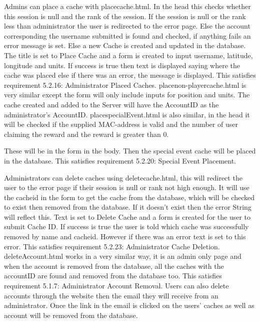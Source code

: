 Admins can place a cache with placecache.html. In the head this checks whether this session is null and the rank of the session. If the session is null or the rank less than administrator the user is redirected to the error page. Else the account corresponding the username submitted is found and checked, if anything fails an error message is set. Else a new Cache is created and updated in the database. The title is set to Place Cache and a form is created to input username, latitude, longitude and units. If success is true then text is displayed saying where the cache was placed else if there was an error, the message is displayed. This satisfies requirement 5.2.16: Administrator Placed Caches. placenon-playercache.html is very similar except the form will only include inputs for position and units. The cache created and added to the Server will have the AccountID as the administrator's AccountID. placespecialEvent.html is also similar, in the head it will be checked if the supplied MAC-address is valid and the number of user claiming the reward and the reward is greater than 0.

These will be in the form in the body. Then the special event cache will be placed in the database. This satisfies requirement 5.2.20: Special Event Placement.

Administrators can delete caches using deletecache.html, this will redirect the user to the error page if their session is null or rank not high enough. It will use the cacheid in the form to get the cache from the database, which will be checked to exist then removed from the database. If it doesn't exist then the error String will reflect this. Text is set to Delete Cache and a form is created for the user to submit Cache ID. If success is true the user is told which cache was successfully removed by name and cacheid. However if there was an error text is set to this error. This satisfies requirement 5.2.23: Administrator Cache Deletion. deleteAccount.html works in a very similar way, it is an admin only page and when the account is removed from the database, all the caches with the accountID are found and removed from the database too. This satisfies requirement 5.1.7: Administrator Account Removal. Users can also delete accounts through the website then the email they will receive from an administrator. Once the link in the email is clicked on the users' caches as well as account will be removed from the database.

